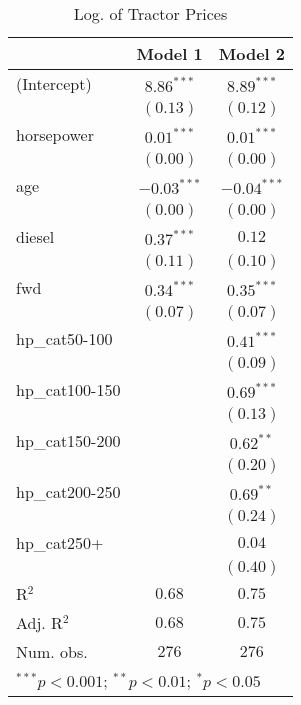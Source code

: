 
\begin{table}
\begin{center}
\begin{tabular}{l c c}
\hline
 & Model 1 & Model 2 \\
\hline
(Intercept)    & $8.86^{***}$  & $8.89^{***}$  \\
               & $(0.13)$      & $(0.12)$      \\
horsepower     & $0.01^{***}$  & $0.01^{***}$  \\
               & $(0.00)$      & $(0.00)$      \\
age            & $-0.03^{***}$ & $-0.04^{***}$ \\
               & $(0.00)$      & $(0.00)$      \\
diesel         & $0.37^{***}$  & $0.12$        \\
               & $(0.11)$      & $(0.10)$      \\
fwd            & $0.34^{***}$  & $0.35^{***}$  \\
               & $(0.07)$      & $(0.07)$      \\
hp\_cat50-100  &               & $0.41^{***}$  \\
               &               & $(0.09)$      \\
hp\_cat100-150 &               & $0.69^{***}$  \\
               &               & $(0.13)$      \\
hp\_cat150-200 &               & $0.62^{**}$   \\
               &               & $(0.20)$      \\
hp\_cat200-250 &               & $0.69^{**}$   \\
               &               & $(0.24)$      \\
hp\_cat250+    &               & $0.04$        \\
               &               & $(0.40)$      \\
\hline
R$^2$          & $0.68$        & $0.75$        \\
Adj. R$^2$     & $0.68$        & $0.75$        \\
Num. obs.      & $276$         & $276$         \\
\hline
\multicolumn{3}{l}{\scriptsize{$^{***}p<0.001$; $^{**}p<0.01$; $^{*}p<0.05$}}
\end{tabular}
\caption{Log. of Tractor Prices}
\label{tab:hp_cat}
\end{center}
\end{table}
